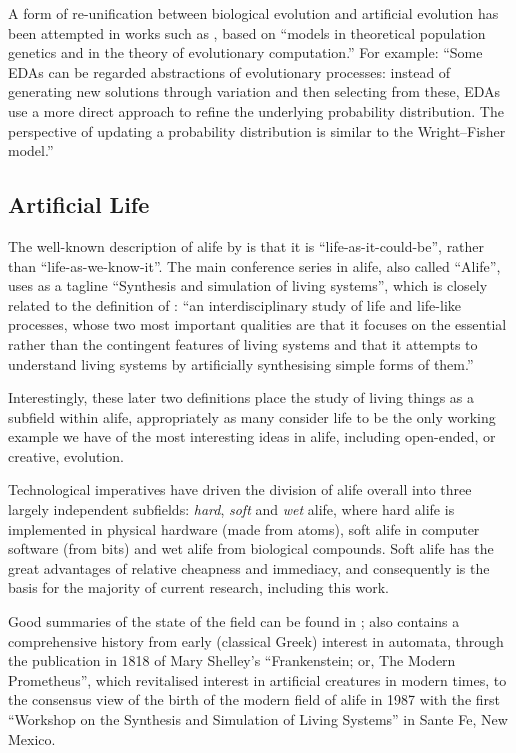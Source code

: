 A form of re-unification between biological evolution and artificial evolution has been attempted in works such as \textcite{Paixao2015}, based on ``models in theoretical population genetics and in the theory of evolutionary computation.'' For example: ``Some EDAs can be regarded abstractions of evolutionary processes: instead of generating new solutions through variation and then selecting from these, EDAs use a more direct approach to refine the underlying probability distribution. The perspective of updating a probability distribution is similar to the Wright--Fisher model.'' \parencite{Paixao2015}

\subsection{Artificial Life}\label{alife}
The well-known description of \gls{alife} by \textcite{Langton1989} is that it is ``life-as-it-could-be'', rather than ``life-as-we-know-it''. The main conference series in \gls{alife}, also called ``Alife'', uses as a tagline ``Synthesis and simulation of living systems'', which is closely related to the definition of \textcite{Bedau:2007ga} : ``an interdisciplinary study of life and life-like processes, whose two most important qualities are that it focuses on the essential rather than the contingent features of living systems and that it attempts to understand living systems by artificially synthesising simple forms of them.''

Interestingly, these later two definitions place the study of living things as a subfield within \gls{alife}, appropriately as many consider life to be the only working example we have of the most interesting ideas in \gls{alife}, including open-ended, or creative, evolution.

Technological imperatives have driven the division of \gls{alife} overall into three largely independent subfields: \emph{hard}, \emph{soft} and \emph{wet} \gls{alife}, where hard \gls{alife} is implemented in physical hardware (made from atoms), soft \gls{alife} in computer software (from bits) and wet \gls{alife} from biological compounds. Soft \gls{alife} has the great advantages of relative cheapness and immediacy, and consequently is the basis for the majority of current research, including this work.

Good summaries of the state of the field can be found in \textcite{Aicardi2010,Aguilar2014}; \textcite{Aguilar2014} also contains a comprehensive history from early (classical Greek) interest in automata, through the publication in 1818 of Mary Shelley's ``Frankenstein; or, The Modern Prometheus'', which revitalised interest in artificial creatures in modern times, to the consensus view of the birth of the modern field of \gls{alife} in 1987 with the first ``Workshop on the Synthesis and Simulation of Living Systems'' in Sante Fe, New Mexico.

